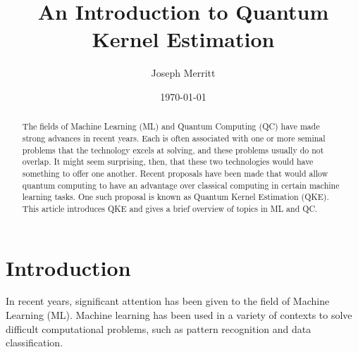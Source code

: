 \documentclass[%
 reprint,
nofootinbib,
 amsmath,amssymb,
 aps,
]{revtex4-2}
\begin{document}
\title{An Introduction to Quantum Kernel Estimation}%


\author{Joseph Merritt}

\begin{abstract}
The fields of Machine Learning (ML) and Quantum Computing (QC) have made strong advances in recent years. Each is often associated with one or more seminal problems that the technology excels at solving, and these problems usually do not overlap. It might seem surprising, then, that these two technologies would have something to offer one another. Recent proposals have been made that would allow quantum computing to have an advantage over classical computing in certain machine learning tasks. One such proposal is known as Quantum Kernel Estimation (QKE). This article introduces QKE and gives a brief overview of topics in ML and QC.
\end{abstract}

\date{\today}%

\maketitle


\section{Introduction}
In recent years, significant attention has been given to the field of Machine Learning (ML). Machine learning has been used in a variety of contexts to solve difficult computational problems, such as pattern recognition and data classification.
\end{document}
